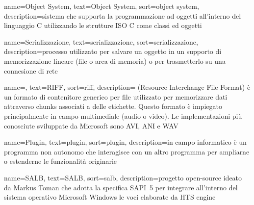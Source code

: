 {
	name=Object System,
	text=Object System,
	sort=object system,
	description={sistema che supporta la programmazione ad oggetti all'interno del linguaggio C utilizzando le strutture ISO C come classi ed oggetti}
}

{
	name=Serializzazione,
	text=serializzazione,
	sort=serializzazione,
	description={processo utilizzato per salvare un oggetto in un supporto di memorizzazione lineare (file o area di memoria) o per trasmetterlo su una connesione di rete}
}

{
	name=,
	text=RIFF,
	sort=riff,
	description={ (Resource Interchange File Format) è un formato di contenitore generico per file utilizzato per memorizzare dati attraverso chunks associati a delle etichette. Questo formato è impiegato principalmente in campo multimediale (audio o video). Le implementazioni più conosciute sviluppate da Microsoft sono AVI, ANI e WAV}
}

{
	name=Plugin,
	text=plugin,
	sort=plugin,
	description={in campo informatico è un programma non autonomo che interagisce con un altro programma per ampliarne o estenderne le funzionalità originarie}
}

{
	name=SALB,
	text=SALB,
	sort=salb,
	description={progetto open-source ideato da Markus Toman che adotta la specifica SAPI~5 per integrare all'interno del sistema operativo Microsoft Windows le voci elaborate da HTS engine}
}

